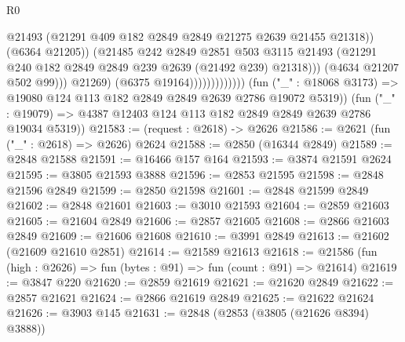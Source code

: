 \begin{lexlean}{R0}
\begin{coremodule}
                                            @21493
                                            (@21291
                                              @409
                                              @182
                                              @2849
                                              @2849
                                              @21275
                                              @2639
                                              @21455
                                              @21318))
                                          (@6364 @21205))
                                        (@21485
                                          @242
                                          @2849
                                          @2851
                                          @503
                                          @3115
                                          @21493
                                          (@21291
                                            @240
                                            @182
                                            @2849
                                            @2849
                                            @239
                                            @2639
                                            (@21492 @239)
                                            @21318)))
                                      (@4634 @21207 @502 @99)))
                                  @21269)
                                (@6375 @19164)))))))))))))
        (fun ("_" : @18068 @3173) => @19080 @124 @113 @182 @2849 @2849 @2639 @2786 @19072 @5319))
      (fun ("_" : @19079) => @4387 @12403 @124 @113 @182 @2849 @2849 @2639 @2786 @19034 @5319))
@21583 := (request : @2618) -> @2626
@21586 := @2621 (fun ("_" : @2618) => @2626) @2624
@21588 := @2850 (@16344 @2849)
@21589 := @2848 @21588
@21591 := @16466 @157 @164
@21593 := @3874 @21591 @2624
@21595 := @3805 @21593 @3888
@21596 := @2853 @21595
@21598 := @2848 @21596 @2849
@21599 := @2850 @21598
@21601 := @2848 @21599 @2849
@21602 := @2848 @21601
@21603 := @3010 @21593
@21604 := @2859 @21603
@21605 := @21604 @2849
@21606 := @2857 @21605
@21608 := @2866 @21603 @2849
@21609 := @21606 @21608
@21610 := @3991 @2849
@21613 := @21602 (@21609 @21610 @2851)
@21614 := @21589 @21613
@21618 := @21586 (fun (high : @2626) => fun (bytes : @91) => fun (count : @91) => @21614)
@21619 := @3847 @220
@21620 := @2859 @21619
@21621 := @21620 @2849
@21622 := @2857 @21621
@21624 := @2866 @21619 @2849
@21625 := @21622 @21624
@21626 := @3903 @145
@21631 := @2848 (@2853 (@3805 (@21626 @8394) @3888))

\end{coremodule}
\end{lexlean}
